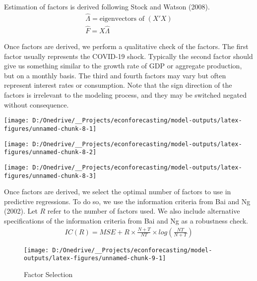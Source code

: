 \documentclass[11pt, letterpaper]{article}\usepackage[]{graphicx}\usepackage[]{color}
\begin{document}
Estimation of factors is derived following Stock and Watson (2008).
\begin{align*}
	\widehat{\Lambda} = \text{eigenvectors of } (X'X)\\
	\widehat{F} = X \widehat{\Lambda}
\end{align*}

Once factors are derived, we perform a qualitative check of the factors. The first factor usually represents the COVID-19 shock. Typically the second factor should give us something similar to the growth rate of GDP or aggregate production, but on a monthly basis. The third and fourth factors may vary but often represent interest rates or consumption. Note that the sign direction of the factors is irrelevant to the modeling process, and they may be switched negated without consequence. 



{\centering \texttt{[image: D:/Onedrive/\_\_Projects/econforecasting/model-outputs/latex-figures/unnamed-chunk-8-1]} 

}




{\centering \texttt{[image: D:/Onedrive/\_\_Projects/econforecasting/model-outputs/latex-figures/unnamed-chunk-8-2]} 

}




{\centering \texttt{[image: D:/Onedrive/\_\_Projects/econforecasting/model-outputs/latex-figures/unnamed-chunk-8-3]} 

}





Once factors are derived, we select the optimal number of factors to use in predictive regressions. To do so, we use the information criteria from Bai and Ng (2002). Let $R$ refer to the number of factors used. We also include alternative specifications of the information criteria from Bai and Ng as a robustness check.
\begin{align*}
	IC(R) = MSE + R \times \frac{N+T}{NT} \times log\left(\frac{NT}{N+T}\right)
\end{align*}

\begin{figure}[H]

{\centering \texttt{[image: D:/Onedrive/\_\_Projects/econforecasting/model-outputs/latex-figures/unnamed-chunk-9-1]} 

}

\caption[Factor Selection]{Factor Selection}\label{fig:unnamed-chunk-9}
\end{figure}
\end{document}
